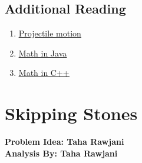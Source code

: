 \documentclass{article}
\newcommand{\namelink}[2]{\textcolor{blue!50!black}{\uline{\href{#1}{#2}}}}
\begin{document}
\subsection{Additional Reading}
\begin{enumerate}
    \item \namelink{https://phys.libretexts.org/@go/page/14447}{Projectile motion}
    \item \namelink{https://jenkov.com/tutorials/java/math-operators-and-math-class.html}{Math in Java}
    \item \namelink{https://www.udacity.com/blog/2021/07/cpp-math-explained.html}{Math in C++}
\end{enumerate}
\newpage
\section{Skipping Stones}
\textbf{Problem Idea: Taha Rawjani\\Analysis By: Taha Rawjani}
\end{document}
